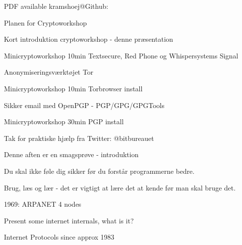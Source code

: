 \documentclass[20pt,landscape,a4paper,footrule]{foils}
\begin{document}

\centerline{\footnotesize PDF available kramshoej@Github: \jobname}


Planen for Cryptoworkshop
\begin{list2}
\item Kort introduktion cryptoworkshop - denne præsentation
\item Minicryptoworkshop 10min Textsecure, Red Phone og Whispersystems Signal
\item Anonymiseringsværktøjet Tor
\item Minicryptoworkshop 10min Torbrowser install
\item Sikker email med OpenPGP - PGP/GPG/GPGTools
\item Minicryptoworkshop 30min PGP install

\end{list2}

Tak for praktiske hjælp fra  Twitter: @bitbureauet




\begin{center}
Denne aften er en smagsprøve - introduktion

Du skal ikke føle dig sikker før du forstår programmerne bedre.

Brug, læs og lær - det er vigtigt at lære det at kende før man skal bruge det.
\end{center}




\centerline{1969: ARPANET 4 nodes}


\begin{list1}
\item Present some internet internals, what is it?
\end{list1}


\vskip 1cm
\centerline{Internet Protocols since approx 1983}
\end{document}
